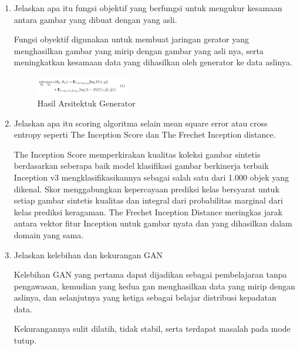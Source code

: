 \begin{enumerate}
        \item Jelaskan apa itu fungsi objektif yang berfungsi untuk mengukur kesamaan antara gambar yang dibuat dengan yang asli.

Fungsi obyektif digunakan untuk membuat jaringan gerator yang menghasilkan gambar yang mirip dengan 
gambar yang asli nya, serta meningkatkan kesamaan data yang dihasilkan oleh generator ke data aslinya.

	\begin{figure}[H]
		\includegraphics[width=4cm]{figures/1174008/8/teori13.PNG}
            	\centering
           	 \caption{Hasil Arsitektuk Generator}
       	 \end{figure}

        \item Jelaskan apa itu scoring algoritma selain mean square error atau cross entropy seperti The Inception Score dan The Frechet Inception distance.

The Inception Score memperkirakan kualitas koleksi gambar sintetis berdasarkan seberapa baik model klasifikasi gambar berkinerja terbaik Inception v3 mengklasifikasikannya sebagai salah satu dari 1.000 objek yang dikenal. Skor menggabungkan kepercayaan prediksi kelas bersyarat untuk setiap gambar sintetis kualitas dan integral dari probabilitas marginal dari kelas prediksi keragaman. The Frechet Inception Distance meringkas jarak antara vektor fitur Inception untuk gambar nyata dan yang dihasilkan dalam domain yang sama.

        \item Jelaskan kelebihan dan kekurangan GAN

Kelebihan GAN yang pertama dapat dijadikan sebagai pembelajaran tanpa pengawasan, kemudian yang kedua gan menghasilkan data yang mirip dengan aslinya, dan selanjutnya yang ketiga sebagai belajar distribusi kepadatan data.

Kekurangannya sulit dilatih, tidak stabil, serta terdapat masalah pada mode tutup.

\end{enumerate}

